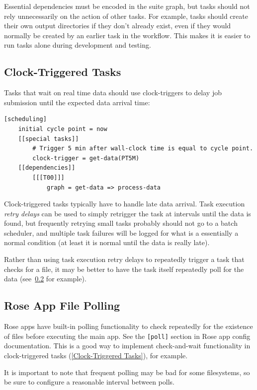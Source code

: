 Essential dependencies must be encoded in the suite graph, but tasks should
not
rely unnecessarily on the action of other tasks. For example, tasks should
create their own output directories if they don't already exist, even if they
would normally be created by an earlier task in the workflow. This makes it is
easier to run tasks alone during development and testing.


\subsection{Clock-Triggered Tasks}
\label{Clock-Triggered Tasks}
Tasks that wait on real time data should use clock-triggers to delay job
submission until the expected data arrival time:

\lstset{language=suiterc}
\begin{lstlisting}
[scheduling]
    initial cycle point = now
    [[special tasks]]
        # Trigger 5 min after wall-clock time is equal to cycle point.
        clock-trigger = get-data(PT5M)
    [[dependencies]]
        [[[T00]]]
            graph = get-data => process-data
\end{lstlisting}

Clock-triggered tasks typically have to handle late data arrival. Task
execution {\em retry delays} can be used to simply retrigger the task at
intervals until the data is found, but frequently retrying small tasks probably
should not go to a batch scheduler, and multiple task failures will be logged
for what is a essentially a normal condition (at least it is normal until the
data is really late).

Rather than using task execution retry delays to repeatedly trigger a task that
checks for a file, it may be better to have the task itself repeatedly poll for
the data (see~\ref{Rose App File Polling} for example).

\subsection{Rose App File Polling}
\label{Rose App File Polling}

Rose apps have built-in polling functionality to check repeatedly for the
existence of files before executing the main app. See the \lstinline=[poll]=
section in Rose app config documentation. This is a good way to implement
check-and-wait functionality in clock-triggered tasks (\ref{Clock-Triggered
Tasks}), for example.

It is important to note that frequent polling may be bad for some filesystems,
so be sure to configure a reasonable interval between polls. 

